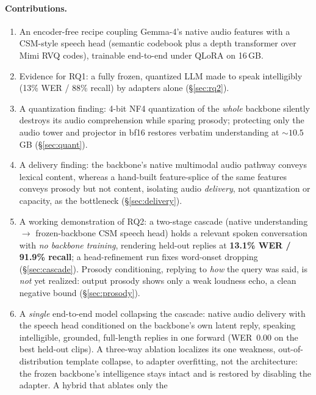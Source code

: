 \documentclass[11pt]{article}
\begin{document}
\paragraph{Contributions.}
\begin{enumerate}
  \item An encoder-free recipe coupling Gemma-4's native audio features with a
        CSM-style speech head (semantic codebook plus a depth transformer over
        Mimi RVQ codes), trainable end-to-end under QLoRA on 16\,GB.
  \item Evidence for RQ1: a fully frozen, quantized LLM made to speak
        intelligibly (13\% WER / 88\% recall) by adapters alone (\S\ref{sec:rq2}).
  \item A quantization finding: 4-bit NF4 quantization of the \emph{whole}
        backbone silently destroys its audio comprehension while sparing prosody;
        protecting only the audio tower and projector in bf16 restores verbatim
        understanding at ${\sim}10.5$\,GB (\S\ref{sec:quant}).
  \item A delivery finding: the backbone's native multimodal audio pathway
        conveys lexical content, whereas a hand-built feature-splice of the same
        features conveys prosody but not content, isolating audio \emph{delivery},
        not quantization or capacity, as the bottleneck (\S\ref{sec:delivery}).
  \item A working demonstration of RQ2: a two-stage cascade (native understanding
        $\to$ frozen-backbone CSM speech head) holds a relevant spoken
        conversation with \emph{no backbone training}, rendering held-out replies
        at \textbf{13.1\% WER / 91.9\% recall}; a head-refinement run fixes
        word-onset dropping (\S\ref{sec:cascade}). Prosody conditioning, replying
        to \emph{how} the query was said, is \emph{not} yet realized: output
        prosody shows only a weak loudness echo, a clean negative bound
        (\S\ref{sec:prosody}).
  \item A \emph{single} end-to-end model collapsing the cascade: native audio
        delivery with the speech head conditioned on the backbone's own latent
        reply, speaking intelligible, grounded, full-length replies in one forward
        (WER~0.00 on the best held-out clips). A three-way ablation localizes its one
        weakness, out-of-distribution template collapse, to adapter overfitting,
        not the architecture: the frozen backbone's intelligence stays intact and is
        restored by disabling the adapter. A hybrid that ablates only the

\end{enumerate}
\end{document}
